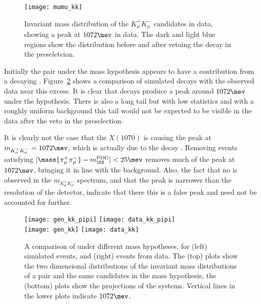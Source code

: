 \begin{figure}
  \begin{center}
    \texttt{[image: mumu\_kk]}
    \caption[Invariant mass of the \mumu distribution under the \kk mass hypotheses]
    {
      Invariant mass distribution of the $K_\mu^+K_\mu^-$ candidates in data, showing a peak at
      \approx$1072\mev$ in data.
      The dark and light blue regions show the distribution before and after vetoing the decay
      \decay{\KS}{\pip\pim} in the preseletcion.
    }
    \label{fig:x1070}
  \end{center}
\end{figure}


Initially the \mumu pair under the \kk mass hypothesis appears to have a contribution from a
decaying \xtsvty.
Figure~\ref{fig:db:x1070:2d} shows a comparison of simulated \decay{\KS}{\pipi} decays with the
observed data near this excess.
It is clear that \decay{\KS}{\pipi} decays produce a peak around $1072\mev$ under the \kk
hypothesis.
There is also a long tail but with low statistics and with a roughly uniform
background this tail would not be expected to be visible in the data after the \KS veto in the
preselection.

It is clearly not the case that the $X(1070)$ is causing the peak at $m_{K^+_\mu
K^-_\mu}=1072\mev$, which is actually due to the decay \decay{\KS}{\pipi}.
Removing events satisfying $|\mass{\pi_\mu^+\pi_\mu^-}-m_{\KS}^\mathrm{PDG}|<25\mev$ removes much
of the peak at $1072\mev$, bringing it in line with the background.
Also, the fact that no \decay{\phi}{\kk} is observed in the $m_{K^+_\mu K^-_\mu}$ spectrum, and
that the peak is narrower than the resolution of the \lhcb detector,
indicate that there this is a false peak and need not be accounted for further.

\begin{figure}
  \begin{center}
    \texttt{[image: gen\_kk\_pipi]}
    \texttt{[image: data\_kk\_pipi]}\\
    \texttt{[image: gen\_kk]}
    \texttt{[image: data\_kk]}
    \caption[Analysis of the \decay{\KS}{\pipi} background under the \kk mass hypothesis]
    {
      A comparison of \decay{\KS}{\pi\pi} under different mass hypotheses, for
      (left) simulated events, and
      (right) events from data.
      The (top) plots show the two dimensional distributions of the invariant mass distributions of
      a \pipi pair and the same candidates in the \kk mass hypothesis, the (bottom)
      plots show the projections of the \kk systems.
      Vertical lines in the lower plots indicate $1072\mev$.
    }
    \label{fig:db:x1070:2d}
  \end{center}
\end{figure}


